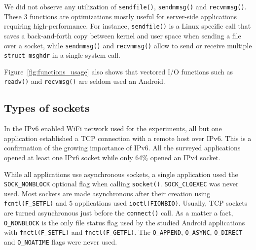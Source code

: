 We did not observe any utilization of \texttt{sendfile()}, \texttt{sendmmsg()}
and \texttt{recvmmsg()}. These 3 functions are optimizations mostly useful for
server-side applications requiring high-performance.  For instance,
\texttt{sendfile()} is a Linux specific call that saves a back-and-forth copy
between kernel and user space when sending a file over a socket, while
\texttt{sendmmsg()} and \texttt{recvmmsg()} allow to send or receive multiple
\texttt{struct msghdr} in a single system call.

Figure~\ref{fig:functions_usage} also shows that vectored I/O functions such as
\texttt{readv()} and \texttt{recvmsg()} are seldom used an Android.

\subsection{Types of sockets}

In the IPv6 enabled WiFi network used for the experiments, all but one
application established a TCP connection with a remote host over IPv6. This is
a confirmation of the growing importance of IPv6. All the surveyed applications
opened at least one IPv6 socket while only 64\% opened an IPv4 socket.

While all applications use asynchronous sockets, a single application used the
\texttt{SOCK\_NONBLOCK} optional flag when calling \texttt{socket()}.
\texttt{SOCK\_CLOEXEC} was never used. Most sockets are made asynchronous after
their creation using \texttt{fcntl(F\_SETFL)} and 5 applications used
\texttt{ioctl(FIONBIO)}. Usually, TCP sockets are turned asynchronous just
before the \texttt{connect()} call. As a matter a fact, \texttt{O\_NONBLOCK} is
the only file status flag used by the studied Android applications with
\texttt{fnctl(F\_SETFL)} and \texttt{fnctl(F\_GETFL)}. The \texttt{O\_APPEND},
\texttt{O\_ASYNC}, \texttt{O\_DIRECT} and \texttt{O\_NOATIME} flags were never
used.
